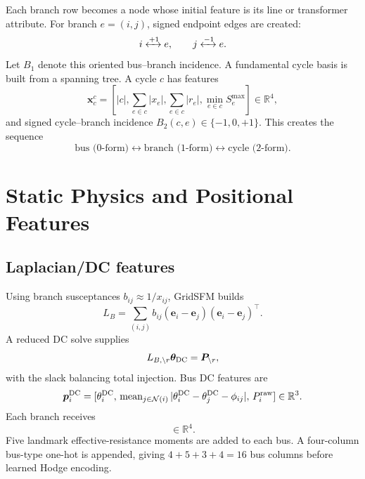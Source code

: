 \documentclass[10pt]{article}
\newcommand{\R}{\mathbb{R}}
\begin{document}
Each branch row becomes a node whose initial feature is its line or transformer
attribute. For branch \(e=(i,j)\), signed endpoint edges are created:
\begin{equation}
 i\xleftrightarrow{+1}e,\qquad j\xleftrightarrow{-1}e.
\end{equation}
Let \(B_1\) denote this oriented bus--branch incidence. A fundamental cycle
basis is built from a spanning tree. A cycle \(c\) has features
\begin{equation}
 \bm x_c^c=[|c|,\sum_{e\in c}|x_e|,\sum_{e\in c}|r_e|,
 \min_{e\in c}S_e^{\max}]\in\R^4,
\end{equation}
and signed cycle--branch incidence \(B_2(c,e)\in\{-1,0,+1\}\). This creates the
sequence
\begin{equation}
 \text{bus (0-form)}\longleftrightarrow
 \text{branch (1-form)}\longleftrightarrow
 \text{cycle (2-form)}.
\end{equation}

\section{Static Physics and Positional Features}

\subsection{Laplacian/DC features}

Using branch susceptances \(b_{ij}\approx1/x_{ij}\), GridSFM builds
\begin{equation}
 L_B=\sum_{(i,j)}b_{ij}(\bm e_i-\bm e_j)(\bm e_i-\bm e_j)^\top.
\end{equation}
A reduced DC solve supplies
\begin{equation}
 L_{B,\setminus r}\bm\theta_{\rm DC}=\bm P_{\setminus r},
\end{equation}
with the slack balancing total injection. Bus DC features are
\begin{equation}
 \bm p_i^{\rm DC}=[\theta_i^{\rm DC},\,\operatorname{mean}_{j\in\mathcal N(i)}
 |\theta_i^{\rm DC}-\theta_j^{\rm DC}-\phi_{ij}|,\,P_i^{\rm raw}]\in\R^3.
\end{equation}
Each branch receives
\begin{equation}
 [\Delta\theta_{ij}^{\rm DC},P_{ij}^{\rm DC},
 \min(|P_{ij}^{\rm DC}|/S_{ij}^{\max},2),\operatorname{sign}P_{ij}^{\rm DC}]\in\R^4.
\end{equation}
Five landmark effective-resistance moments are added to each bus. A four-column
bus-type one-hot is appended, giving \(4+5+3+4=16\) bus columns before learned
Hodge encoding.
\end{document}
